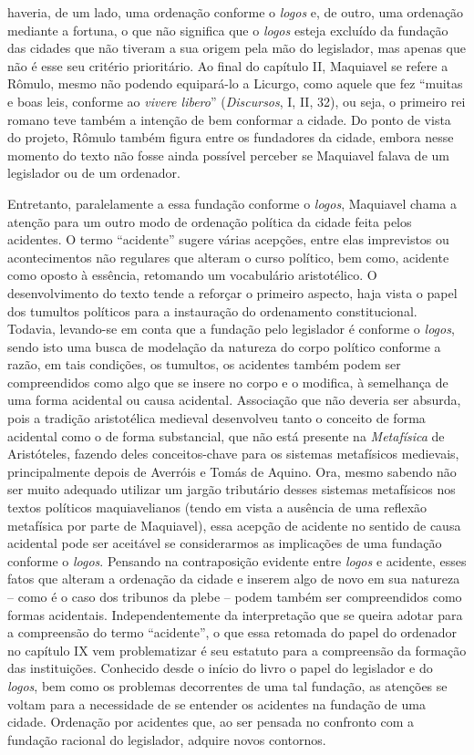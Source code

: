 haveria, de um lado, uma ordenação conforme o \emph{logos} e, de outro,
uma ordenação mediante a fortuna, o que não significa que o \emph{logos}
esteja excluído da fundação das cidades que não tiveram a sua origem
pela mão do legislador, mas apenas que não é esse seu critério
prioritário. Ao final do capítulo II, Maquiavel se refere a Rômulo,
mesmo não podendo equipará-lo a Licurgo, como aquele que fez ``muitas e
boas leis, conforme ao \emph{vivere libero}'' (\emph{Discursos}, I, II,
32), ou seja, o primeiro rei romano teve também a intenção de bem
conformar a cidade. Do ponto de vista do projeto, Rômulo também figura
entre os fundadores da cidade, embora nesse momento do texto não fosse
ainda possível perceber se Maquiavel falava de um legislador ou de um
ordenador.

Entretanto, paralelamente a essa fundação conforme o \emph{logos},
Maquiavel chama a atenção para um outro modo de ordenação política da
cidade feita pelos acidentes. O termo ``acidente'' sugere várias
acepções, entre elas imprevistos ou acontecimentos não regulares que
alteram o curso político, bem como, acidente como oposto à essência,
retomando um vocabulário aristotélico. O desenvolvimento do texto tende
a reforçar o primeiro aspecto, haja vista o papel dos tumultos políticos
para a instauração do ordenamento constitucional. Todavia, levando-se em
conta que a fundação pelo legislador é conforme o \emph{logos}, sendo
isto uma busca de modelação da natureza do corpo político conforme a
razão, em tais condições, os tumultos, os acidentes também podem ser
compreendidos como algo que se insere no corpo e o modifica, à
semelhança de uma forma acidental ou causa acidental. Associação que não
deveria ser absurda, pois a tradição aristotélica medieval desenvolveu
tanto o conceito de forma acidental como o de forma substancial, que não
está presente na \emph{Metafísica} de Aristóteles, fazendo deles
conceitos-chave para os sistemas metafísicos medievais, principalmente
depois de Averróis e Tomás de Aquino. Ora, mesmo sabendo não ser muito
adequado utilizar um jargão tributário desses sistemas metafísicos nos
textos políticos maquiavelianos (tendo em vista a ausência de uma
reflexão metafísica por parte de Maquiavel), essa acepção de acidente no
sentido de causa acidental pode ser aceitável se considerarmos as
implicações de uma fundação conforme o \emph{logos}. Pensando na
contraposição evidente entre \emph{logos} e acidente, esses fatos que
alteram a ordenação da cidade e inserem algo de novo em sua natureza --
como é o caso dos tribunos da plebe -- podem também ser compreendidos
como formas acidentais. Independentemente da interpretação que se queira
adotar para a compreensão do termo ``acidente'', o que essa retomada do
papel do ordenador no capítulo IX vem problematizar é seu estatuto para
a compreensão da formação das instituições. Conhecido desde o início do
livro o papel do legislador e do \emph{logos}, bem como os problemas
decorrentes de uma tal fundação, as atenções se voltam para a
necessidade de se entender os acidentes na fundação de uma cidade.
Ordenação por acidentes que, ao ser pensada no confronto com a fundação
racional do legislador, adquire novos contornos.

